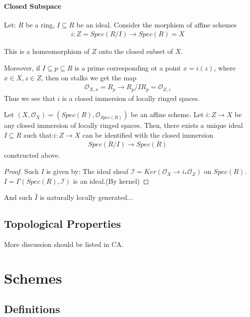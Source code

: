 \documentclass[Total.tex]{subfiles}
\begin{document}
			\subsubsection{Closed Subspace}
			\begin{example}
				Let: $R$ be a ring, $I\subseteq R$ be an ideal. Consider the morphism of affine schemes
				\begin{gather*}
					i:Z=Spec(R/I)\rightarrow Spec(R)=X
				\end{gather*}
				
				This is a homeomorphism of $Z$ onto the closed subset of $X$. 
				
				Moreover, if $I\subseteq p\subseteq R$ is a prime corresponding ot a point $x=i(z)$, where $x\in X,z\in Z$, then on stalks we get the map
				\begin{gather*}
					\mathcal{O}_{X,x}=R_p\rightarrow R_p/IR_p=\mathcal{O}_{Z,z}
				\end{gather*} 
				Thus we see that $i$ is a closed immersion of locally ringed spaces.
			\end{example}
			\begin{lemma}
				Let $(X,\mathcal{O}_X)=(Spec(R),\mathcal{O}_{Spec(R)})$ be an affine scheme. Let $i:Z\rightarrow X$ be any closed immersion of locally ringed spaces. Then, there exists a unique ideal $I\subseteq R$ such that:$i:Z\rightarrow X$ can be identified with the closed immersion
				\begin{gather*}
					Spec(R/I)\rightarrow Spec(R)
				\end{gather*}
				constructed above.
			\end{lemma}
			\begin{proof}
				Such $I$ is given by: The ideal sheaf $\mathcal{I}=Ker(\mathcal{O}_X\rightarrow i_*\mathcal{O}_Z)$ on $Spec(R)$. $I=\Gamma(Spec(R),\mathcal{I})$ is an ideal.(By kernel)
			\end{proof}
			
			And such $\hat{I}$ is naturally locally generated...
		\section{Topological Properties}
			More discussion should be listed in CA.
	\chapter{Schemes}
		\section{Definitions}
			
\end{document}
